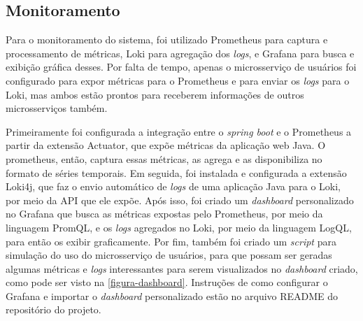 

\subsection*{Monitoramento}
Para o monitoramento do sistema, foi utilizado Prometheus para captura e processamento de métricas, Loki para agregação dos \emph{logs}, e Grafana para busca e exibição gráfica desses. Por falta de tempo, apenas o microsserviço de usuários foi configurado para expor métricas para o Prometheus e para enviar os \emph{logs} para o Loki, mas ambos estão prontos para receberem informações de outros microsserviços também. 

Primeiramente foi configurada a integração entre o \emph{spring boot} e o Prometheus a partir da extensão Actuator, que expõe métricas da aplicação web Java. O prometheus, então, captura essas métricas, as agrega e as disponibiliza no formato de séries temporais. Em seguida, foi instalada e configurada a extensão Loki4j, que faz o envio automático de \emph{logs} de uma aplicação Java para o Loki, por meio da API que ele expõe. Após isso, foi criado um \emph{dashboard} personalizado no Grafana que busca as métricas expostas pelo Prometheus, por meio da linguagem PromQL, e os \emph{logs} agregados no Loki, por meio da linguagem LogQL, para então os exibir graficamente. Por fim, também foi criado um \emph{script} para simulação do uso do microsserviço de usuários, para que possam ser geradas algumas métricas e \emph{logs} interessantes para serem visualizados no \emph{dashboard} criado, como pode ser visto na \autoref{figura-dashboard}. Instruções de como configurar o Grafana e importar o \emph{dashboard} personalizado estão no arquivo README do repositório do projeto.

